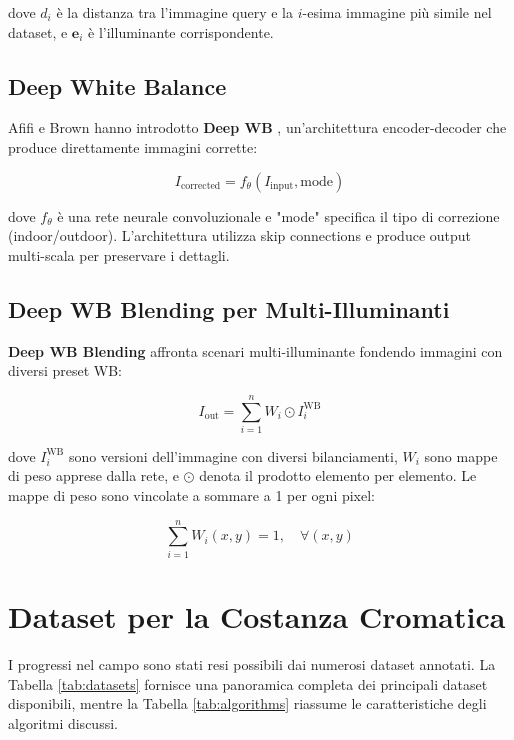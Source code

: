 dove $d_i$ è la distanza tra l'immagine query e la $i$-esima immagine più simile nel dataset, e $\mathbf{e}_i$ è l'illuminante corrispondente.

\subsection{Deep White Balance}

Afifi e Brown hanno introdotto \textbf{Deep WB} \cite{afifi_deep_2020}, un'architettura encoder-decoder che produce direttamente immagini corrette:

\begin{equation}
I_{\text{corrected}} = f_{\theta}(I_{\text{input}}, \text{mode})
\end{equation}

dove $f_{\theta}$ è una rete neurale convoluzionale e "mode" specifica il tipo di correzione (indoor/outdoor). L'architettura utilizza skip connections e produce output multi-scala per preservare i dettagli.

\subsection{Deep WB Blending per Multi-Illuminanti}

\textbf{Deep WB Blending} \cite{afifi_auto_2022} affronta scenari multi-illuminante fondendo immagini con diversi preset WB:

\begin{equation}
I_{\text{out}} = \sum_{i=1}^{n} W_i \odot I_i^{\text{WB}}
\end{equation}

dove $I_i^{\text{WB}}$ sono versioni dell'immagine con diversi bilanciamenti, $W_i$ sono mappe di peso apprese dalla rete, e $\odot$ denota il prodotto elemento per elemento. Le mappe di peso sono vincolate a sommare a 1 per ogni pixel:

\begin{equation}
\sum_{i=1}^{n} W_i(x,y) = 1, \quad \forall (x,y)
\end{equation}

\section{Dataset per la Costanza Cromatica}

I progressi nel campo sono stati resi possibili dai numerosi dataset annotati. La Tabella \ref{tab:datasets} fornisce una panoramica completa dei principali dataset disponibili, mentre la Tabella \ref{tab:algorithms} riassume le caratteristiche degli algoritmi discussi.

